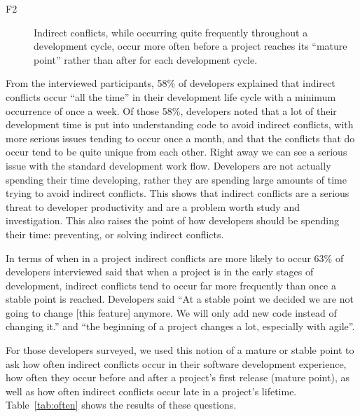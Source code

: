 \documentclass[conference]{IEEEtran}
\makeatletter
\def\namedlabel#1#2{\begingroup
   \def\@currentlabel{#2}%
   \label{#1}\endgroup
}
\makeatother
\begin{document}
\begin{description}
	\item[F2\namedlabel{itm:f2}{F2}] Indirect conflicts, while occurring quite frequently throughout a development cycle,
						occur more often before a project reaches its ``mature point'' rather than after for each development cycle.
\end{description}

From the interviewed participants, 58\% of developers explained that indirect conflicts occur ``all the time'' in
their development life cycle with a minimum occurrence of once a week. Of those 58\%, developers noted that a
lot of their development time is put into understanding code to avoid indirect conflicts, with more serious issues tending
to occur once a month, and that the conflicts that do occur tend to be quite unique from each other. Right away we can see a serious issue with the standard
development work flow. Developers are not actually spending their time developing, rather they are spending large amounts of time trying to avoid indirect
conflicts. This shows that indirect conflicts are a serious threat to developer productivity and are a problem worth study and investigation. This also
raises the point of how developers should be spending their time: preventing, or solving indirect conflicts.

In terms of when in a project indirect conflicts are more likely to occur 63\% of developers interviewed said that
when a project is in the early stages of development, indirect conflicts tend to occur far more frequently
than once a stable point is reached. Developers said ``At a stable point we decided we are not going to change
[this feature] anymore. We will only add new code instead of changing it.'' and ``the beginning of a project 
changes a lot, especially with agile''.

For those developers surveyed, we used this notion of a mature or stable point to ask how often indirect conflicts occur in their software development experience,
how often they occur before and after a project's first release (mature point), as well as how often indirect conflicts occur late
in a project's lifetime. Table~\ref{tab:often} shows the results of these questions.
\end{document}
